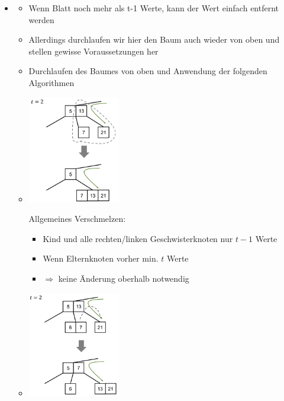\documentclass[
    12pt,
    a4paper,
    ngerman,
    color=3b,%
    marginpar=false,
    colorback=false,
    leqno,
]{tudaexercise}
\begin{document}
\begin{itemize}
        \item {}
            \begin{itemize}
                \item Wenn Blatt noch mehr als t-1 Werte, kann der Wert einfach entfernt werden
                \item Allerdings durchlaufen wir hier den Baum auch wieder von oben und stellen gewisse Voraussetzungen her
                \item Durchlaufen des Baumes von oben und Anwendung der folgenden Algorithmen
                \item[]
                    \begin{minipage}{0.25\textwidth}
                        \includegraphics[width=4cm]{pictures/bbaumMelt.PNG}
                    \end{minipage}
                    \begin{minipage}{0.65\textwidth}
                        Allgemeines Verschmelzen:
                        \begin{itemize}
                            \item Kind und alle rechten/linken Geschwisterknoten nur $t-1$ Werte
                            \item Wenn Elternknoten vorher min. $t$ Werte
                            \item[] $\Rightarrow$ keine Änderung oberhalb notwendig
                        \end{itemize}
                    \end{minipage}
                \item[]
                    \begin{minipage}{0.25\textwidth}
                        \includegraphics[width=4cm]{pictures/bbaumRot.PNG}

\end{minipage}
\end{itemize}
\end{itemize}
\end{document}
